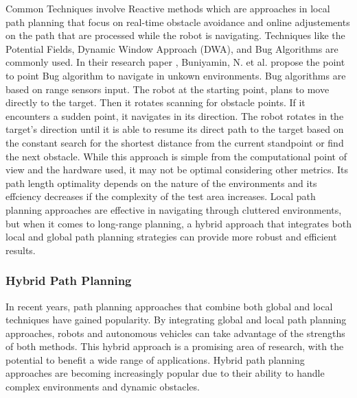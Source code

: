 Common Techniques involve Reactive methods which are approaches in local path planning that focus on real-time
obstacle avoidance and online adjustements on the path that are processed while the robot is navigating.
Techniques like the Potential Fields, 
Dynamic Window Approach (DWA), and Bug Algorithms are commonly used. In their research paper \cite{R25},
Buniyamin, N. et al. propose the point to point Bug algorithm to navigate in unkown environments. 
Bug algorithms are based on range sensors input. The robot at the starting point, plans to move directly to the 
target. Then it rotates scanning for obstacle points. If it encounters a sudden point, it navigates in its direction.
The robot rotates in the target's direction until it is able to resume its direct path to the target based on the 
constant search for the shortest distance from the current standpoint or find the next obstacle. 
While this approach is simple from the computational point of view and the hardware used, it may not be 
optimal considering other metrics.
Its path length optimality depends on the nature of the environments and its effciency decreases if the complexity
of the test area increases. 
Local path planning approaches are effective in navigating through cluttered environments, but when it comes to 
long-range planning, a hybrid approach that integrates both local and global path planning strategies can provide 
more robust and efficient results.

\subsubsection {Hybrid Path Planning}

In recent years, path planning approaches that combine both global and local techniques have gained popularity. 
By integrating global and local path planning approaches, robots and autonomous vehicles can take advantage of 
the strengths of both methods. This hybrid approach is a promising area of research, with the potential to benefit 
a wide range of applications. Hybrid path planning approaches are becoming increasingly popular due to their ability 
to handle complex environments and dynamic obstacles.

